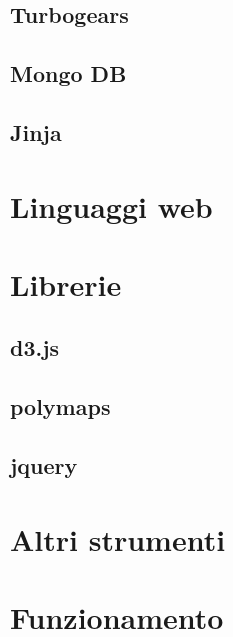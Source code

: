 		\subsection{Turbogears}
		\subsection{Mongo DB}\label{sec:mongo}
		\subsection{Jinja}%
	\section{Linguaggi web}
	\section{Librerie}
		\subsection{d3.js}\label{sec:d3}
		\subsection{polymaps}\label{sec:polymaps}
		\subsection{jquery}
	\section{Altri strumenti}
			
	\section{Funzionamento}%
